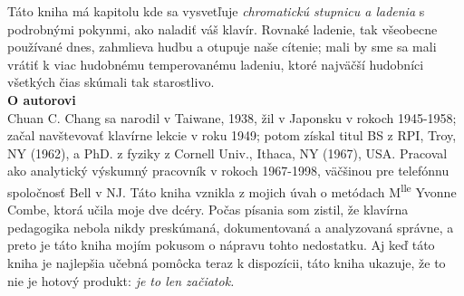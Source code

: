 Táto kniha má kapitolu kde sa vysvetľuje \emph{chromatickú stupnicu a ladenia} s podrobnými pokynmi, ako naladiť váš klavír. Rovnaké ladenie, tak všeobecne používané dnes, zahmlieva hudbu a otupuje naše cítenie; mali by sme sa mali vrátiť k viac hudobnému temperovanému ladeniu, ktoré najväčší hudobníci všetkých čias skúmali tak starostlivo.
\vspace*{2em}\\
{\large\bf O autorovi}\\
Chuan C. Chang sa narodil v Taiwane, 1938, žil v Japonsku v rokoch 1945-1958; začal navštevovať klavírne lekcie v roku 1949; potom získal titul BS z RPI, Troy, NY (1962), a PhD. z fyziky z Cornell Univ., Ithaca, NY (1967), USA. Pracoval ako analytický výskumný pracovník v rokoch 1967-1998, väčšinou pre telefónnu spoločnosť Bell v NJ. Táto kniha vznikla z mojich úvah o metódach M\textsuperscript{lle} Yvonne Combe, ktorá učila moje dve dcéry. Počas písania som zistil, že klavírna pedagogika nebola nikdy preskúmaná, dokumentovaná a analyzovaná správne, a preto je táto kniha mojím pokusom o nápravu tohto nedostatku. Aj keď táto kniha je najlepšia učebná pomôcka teraz k dispozícii, táto kniha ukazuje, že to nie je hotový produkt: \emph{je to len začiatok.}
